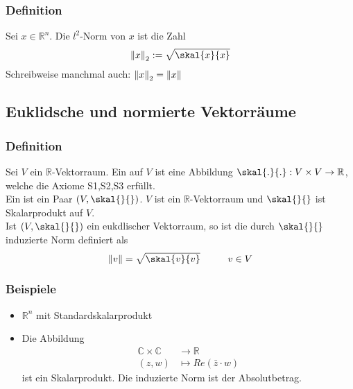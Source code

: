 \subsubsection[Die $l^2$-Norm]{Definition} %
\label{ssub:definition}
Sei $x \in \mathbb{R}^n$. Die $l^2$-Norm von $x$ ist die Zahl
\[
	\norm{x}_2:= \sqrt{\skal{x}{x}} 
\]
Schreibweise manchmal auch: $\norm{x}_2 = \norm{x}$

\subsection{Euklidsche und normierte Vektorräume} %
\label{sub:euklidsche_und_normierte_vektorraume}

\subsubsection[Euklidscher Vektorraum]{Definition} %
\label{ssub:definition}
Sei $ V$  ein $\mathbb{R}$-Vektorraum. Ein  auf $ V$  ist eine Abbildung $\skal{.}{.}:V \times V \to \mathbb{R}$, welche die Axiome S1,S2,S3 erfüllt. \\
Ein  ist ein Paar $(V,\skal{}{})$. $ V$  ist ein $\mathbb{R}$-Vektorraum und $\skal{}{}$ ist Skalarprodukt auf $ V$. \\
Ist $(V,\skal{}{})$ ein eukdlischer Vektorraum, so ist die durch $\skal{}{}$ induzierte Norm definiert als \[
	\norm{v}=\sqrt{\skal{v}{v}} \hspace{1cm}  v \in V 
	\]

\subsubsection[Beispiel euklidscher Vektorraum]{Beispiele} %
\label{ssub:beispiele}

\begin{itemize}
	\item $\mathbb{R}^n$ mit Standardskalarprodukt
	\item Die Abbildung \begin{align*}
		 \mathbb{C} \times \mathbb{C} &\to \mathbb{R} \\
		 (z,w) &\mapsto Re(\bar z \cdot w)
		 \end{align*}
		 ist ein Skalarprodukt. Die induzierte Norm ist der Absolutbetrag.      
\end{itemize}

